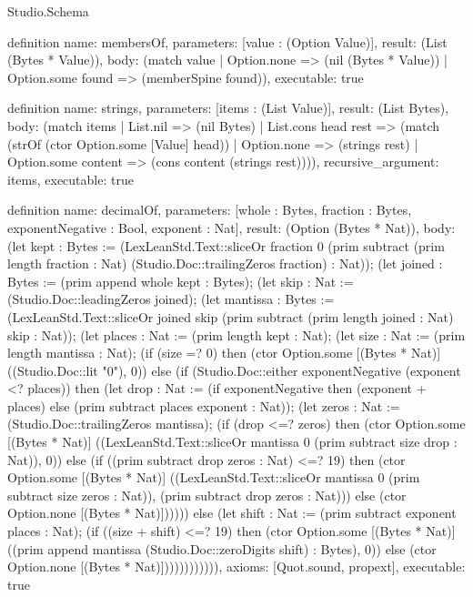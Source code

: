 \begin{lexlean}{Studio.Schema}
\begin{semanticmodule}
definition{
  name: membersOf,
  parameters: [value : (Option Value)],
  result: (List (Bytes * Value)),
  body: (match value
    | Option.none => (nil (Bytes * Value))
    | Option.some found => (memberSpine found)),
  executable: true
}

definition{
  name: strings,
  parameters: [items : (List Value)],
  result: (List Bytes),
  body: (match items
    | List.nil => (nil Bytes)
    | List.cons head rest => (match (strOf (ctor Option.some [Value] head))
      | Option.none => (strings rest)
      | Option.some content => (cons content (strings rest)))),
  recursive_argument: items,
  executable: true
}

definition{
  name: decimalOf,
  parameters: [whole : Bytes, fraction : Bytes, exponentNegative : Bool, exponent : Nat],
  result: (Option (Bytes * Nat)),
  body: (let kept : Bytes := (LexLeanStd.Text::sliceOr fraction 0 (prim subtract (prim length fraction : Nat) (Studio.Doc::trailingZeros fraction) : Nat)); (let joined : Bytes := (prim append whole kept : Bytes); (let skip : Nat := (Studio.Doc::leadingZeros joined); (let mantissa : Bytes := (LexLeanStd.Text::sliceOr joined skip (prim subtract (prim length joined : Nat) skip : Nat)); (let places : Nat := (prim length kept : Nat); (let size : Nat := (prim length mantissa : Nat); (if (size =? 0) then (ctor Option.some [(Bytes * Nat)] ((Studio.Doc::lit "0"), 0)) else (if (Studio.Doc::either exponentNegative (exponent <? places)) then (let drop : Nat := (if exponentNegative then (exponent + places) else (prim subtract places exponent : Nat)); (let zeros : Nat := (Studio.Doc::trailingZeros mantissa); (if (drop <=? zeros) then (ctor Option.some [(Bytes * Nat)] ((LexLeanStd.Text::sliceOr mantissa 0 (prim subtract size drop : Nat)), 0)) else (if ((prim subtract drop zeros : Nat) <=? 19) then (ctor Option.some [(Bytes * Nat)] ((LexLeanStd.Text::sliceOr mantissa 0 (prim subtract size zeros : Nat)), (prim subtract drop zeros : Nat))) else (ctor Option.none [(Bytes * Nat)]))))) else (let shift : Nat := (prim subtract exponent places : Nat); (if ((size + shift) <=? 19) then (ctor Option.some [(Bytes * Nat)] ((prim append mantissa (Studio.Doc::zeroDigits shift) : Bytes), 0)) else (ctor Option.none [(Bytes * Nat)]))))))))))),
  axioms: [Quot.sound, propext],
  executable: true
}


\end{semanticmodule}
\end{lexlean}
